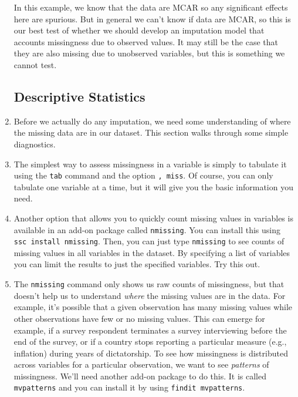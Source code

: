 \documentclass[a4paper,12pt]{article}
\begin{document}
\begin{enumerate}
In this example, we know that the data are MCAR so any significant effects here are spurious. But in general we can't know if data are MCAR, so this is our best test of whether we should develop an imputation model that accounts missingness due to observed values.  It may still be the case that they are also missing due to unobserved variables, but this is something we cannot test.


\subsection*{Descriptive Statistics}

\item Before we actually do any imputation, we need some understanding of where the missing data are in our dataset. This section walks through some simple diagnostics.

\item The simplest way to assess missingness in a variable is simply to tabulate it using the \texttt{tab} command and the option \texttt{, miss}. Of course, you can only tabulate one variable at a time, but it will give you the basic information you need.

\item Another option that allows you to quickly count missing values in variables is available in an add-on package called \texttt{nmissing}. You can install this using \texttt{ssc install nmissing}. Then, you can just type \texttt{nmissing} to see counts of missing values in all variables in the dataset. By specifying a list of variables you can limit the results to just the specified variables. Try this out.

\item The \texttt{nmissing} command only shows us raw counts of missingness, but that doesn't help us to understand {\em where} the missing values are in the data. For example, it's possible that a given observation has many missing values while other observations have few or no missing values. This can emerge for example, if a survey respondent terminates a survey interviewing before the end of the survey, or if a country stops reporting a particular measure (e.g., inflation) during years of dictatorship. To see how missingness is distributed across variables for a particular observation, we want to see {\em patterns} of missingness. We'll need another add-on package to do this. It is called \texttt{mvpatterns} and you can install it by using \texttt{findit mvpatterns}.



\end{enumerate}
\end{document}
